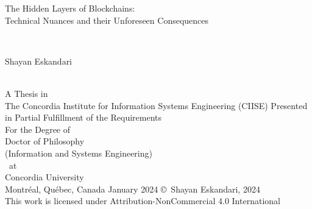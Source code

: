 
\thispagestyle{empty} %

\begin{center} 
\begin{Large} The Hidden Layers of Blockchains: \\ Technical Nuances and their Unforeseen Consequences\end{Large}\\[3em]
\begin{large} Shayan Eskandari \end{large}\\
\vfill
A Thesis in\\
The Concordia Institute for Information Systems Engineering (CIISE)
\vfill
Presented in Partial Fulfillment of the Requirements\\
For the Degree of\\
Doctor of Philosophy\\ 
(Information and Systems Engineering)\\~at\\
Concordia University\\
Montr\'{e}al, Qu\'{e}bec, Canada
\vfill
January 2024 %
\vfill
\copyright~Shayan Eskandari, 2024\\
This work is licensed under Attribution-NonCommercial 4.0 International
\end{center}

